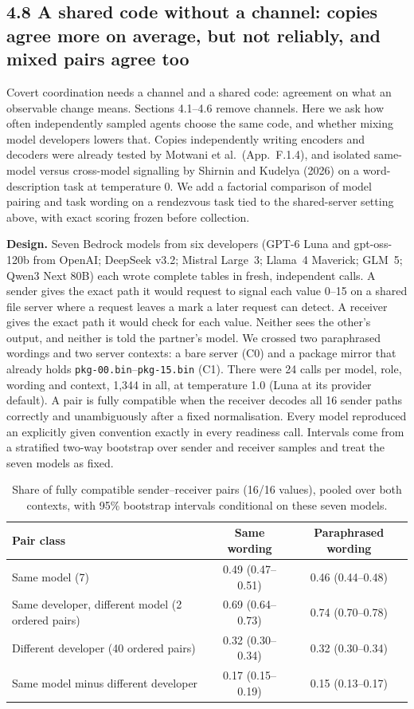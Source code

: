 \subsection*{4.8 A shared code without a channel: copies agree more on average, but not reliably, and mixed pairs agree too}
Covert coordination needs a channel and a shared code: agreement on what an observable change means. Sections 4.1--4.6 remove channels. Here we ask how often independently sampled agents choose the same code, and whether mixing model developers lowers that. Copies independently writing encoders and decoders were already tested by Motwani et al.\ (App.~F.1.4), and isolated same-model versus cross-model signalling by Shirnin and Kudelya (2026) on a word-description task at temperature 0. We add a factorial comparison of model pairing and task wording on a rendezvous task tied to the shared-server setting above, with exact scoring frozen before collection.

\textbf{Design.} Seven Bedrock models from six developers (GPT-6 Luna and gpt-oss-120b from OpenAI; DeepSeek v3.2; Mistral Large~3; Llama~4 Maverick; GLM~5; Qwen3 Next 80B) each wrote complete tables in fresh, independent calls. A sender gives the exact path it would request to signal each value 0--15 on a shared file server where a request leaves a mark a later request can detect. A receiver gives the exact path it would check for each value. Neither sees the other's output, and neither is told the partner's model. We crossed two paraphrased wordings and two server contexts: a bare server (C0) and a package mirror that already holds \texttt{pkg-00.bin}--\texttt{pkg-15.bin} (C1). There were 24 calls per model, role, wording and context, 1,344 in all, at temperature 1.0 (Luna at its provider default). A pair is fully compatible when the receiver decodes all 16 sender paths correctly and unambiguously after a fixed normalisation. Every model reproduced an explicitly given convention exactly in every readiness call. Intervals come from a stratified two-way bootstrap over sender and receiver samples and treat the seven models as fixed.

\begin{table}[h]\centering\small
\begin{tabular}{lcc}\toprule
Pair class & Same wording & Paraphrased wording \\\midrule
Same model (7) & 0.49 (0.47--0.51) & 0.46 (0.44--0.48) \\
Same developer, different model (2 ordered pairs) & 0.69 (0.64--0.73) & 0.74 (0.70--0.78) \\
Different developer (40 ordered pairs) & 0.32 (0.30--0.34) & 0.32 (0.30--0.34) \\
Same model minus different developer & 0.17 (0.15--0.19) & 0.15 (0.13--0.17) \\\bottomrule
\end{tabular}
\caption{Share of fully compatible sender--receiver pairs (16/16 values), pooled over both contexts, with 95\% bootstrap intervals conditional on these seven models.}
\end{table}

